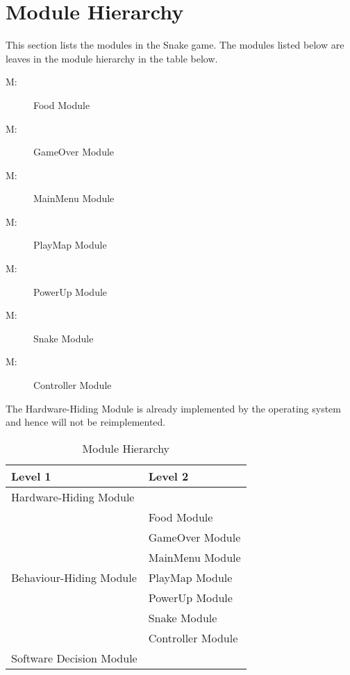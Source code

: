 \documentclass[12pt]{article}
\newcounter{mnum}
\newcommand{\mthemnum}{M\themnum}
\begin{document}
\section{Module Hierarchy} \label{SecMH}

This section lists the modules in the Snake game. The modules listed below are leaves in the module hierarchy in the table below. 

\begin{description}
\item [ \mthemnum \label{mFood}:] Food Module
\item [ \mthemnum \label{mGameOver}:] GameOver Module
\item [ \mthemnum \label{mMainMenu}:] MainMenu Module
\item [ \mthemnum \label{mPlayMap}:] PlayMap Module
\item [ \mthemnum \label{mPowerUp}:] PowerUp Module
\item [ \mthemnum \label{mSnake}:] Snake Module
\item [ \mthemnum \label{mController}:] Controller Module
\end{description}

The Hardware-Hiding Module is already implemented by the operating system and hence will not be reimplemented.

\begin{table}[h!]
\centering
\begin{tabular}{p{} p{}}
\toprule
\textbf{Level 1} & \textbf{Level 2}\\
\midrule

{Hardware-Hiding Module} & ~ \\
\midrule

\multirow{7}{0.3\textwidth}{Behaviour-Hiding Module} 
& Food Module\\
& GameOver Module\\
& MainMenu Module\\
& PlayMap Module\\
& PowerUp Module\\ 
& Snake Module\\
& Controller Module\\
\midrule

{Software Decision Module} & ~ \\
\bottomrule

\end{tabular}
\caption{Module Hierarchy}
\label{TblMH}
\end{table}
\end{document}
